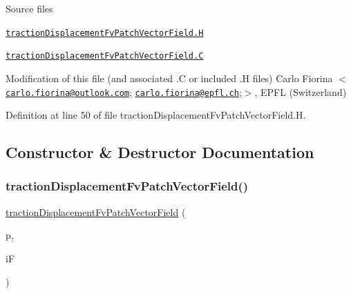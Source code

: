 \label{_Description}%
 \begin{DoxyParagraph}{Source files}

\begin{DoxyItemize}
\item \href{../../../home/carlo/data/GeN-Foam/GeN-Foam_ffn/GeN-Foam/GeN-Foam/classes/thermoMechanics/tractionDisplacement/tractionDisplacementFvPatchVectorField.H}{\tt traction\+Displacement\+Fv\+Patch\+Vector\+Field.\+H} 
\item \href{../../../home/carlo/data/GeN-Foam/GeN-Foam_ffn/GeN-Foam/GeN-Foam/classes/thermoMechanics/tractionDisplacement/tractionDisplacementFvPatchVectorField.C}{\tt traction\+Displacement\+Fv\+Patch\+Vector\+Field.\+C} 
\end{DoxyItemize}Modification of this file (and associated .C or included .H files) Carlo Fiorina $<$\href{mailto:carlo.fiorina@outlook.com}{\tt carlo.\+fiorina@outlook.\+com}; \href{mailto:carlo.fiorina@epfl.ch}{\tt carlo.\+fiorina@epfl.\+ch};$>$, E\+P\+FL (Switzerland) 
\end{DoxyParagraph}


Definition at line 50 of file traction\+Displacement\+Fv\+Patch\+Vector\+Field.\+H.



\subsection{Constructor \& Destructor Documentation}
\mbox{\label{classFoam_1_1tractionDisplacementFvPatchVectorField_ac7250c3f719a062396a386a9d61bc08f}} 
\subsubsection{\texorpdfstring{traction\+Displacement\+Fv\+Patch\+Vector\+Field()}{tractionDisplacementFvPatchVectorField()}\hspace{0.1cm}{\footnotesize\ttfamily [1/5]}}
{\footnotesize\ttfamily \hyperlink{classFoam_1_1tractionDisplacementFvPatchVectorField}{traction\+Displacement\+Fv\+Patch\+Vector\+Field} (\begin{DoxyParamCaption}\item[{const fv\+Patch \&}]{p,  }\item[{const Dimensioned\+Field$<$ vector, vol\+Mesh $>$ \&}]{iF }\end{DoxyParamCaption})}



